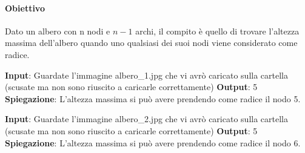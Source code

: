     \paragraph{Obiettivo} Dato un albero con n nodi e $n-1$ archi, il compito è quello di trovare l'altezza massima dell'albero quando uno qualsiasi dei suoi nodi viene considerato come radice.
    \begin{esempio}
        \newline
        \textbf{Input}: Guardate l'immagine albero\_1.jpg che vi avrò caricato sulla cartella (scusate ma non sono riuscito a caricarle correttamente)
        \newline
        \textbf{Output}: 5
        \newline
        \textbf{Spiegazione}: L'altezza massima si può avere prendendo come radice il nodo 5.
    \end{esempio}
    \begin{esempio}
        \newline
        \textbf{Input}: Guardate l'immagine albero\_2.jpg che vi avrò caricato sulla cartella (scusate ma non sono riuscito a caricarle correttamente)
        \newline
        \textbf{Output}: 5
        \newline
        \textbf{Spiegazione}: L'altezza massima si può avere prendendo come radice il nodo 6.
    \end{esempio}
